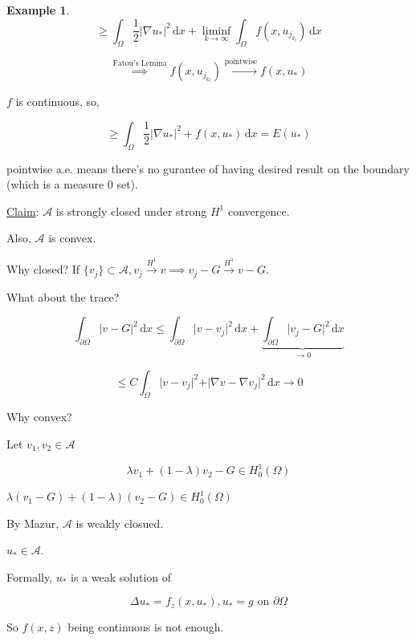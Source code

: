 \documentclass{article}
\theoremstyle{definition}
\newtheorem{example}{Example}
\begin{document}
\begin{example}
    \[
        \geq \int_{\Omega} \frac{1}{2} \vert \nabla u_{\ast} \vert^2  \,\mathrm{d}x + \liminf_{k \to \infty} \int_{\Omega} f(x,u_{j_{k_l} }) \,\mathrm{d}x 
    \]

    \[
        \overset{\text{Fatou's Lemma}}{\implies} f(x,u_{j_{k_l} }) \overset{\text{pointwise}}{\to} f(x,u_{\ast})
    \]

    \(f\) is continuous, so,

    \[
        \geq \int_{\Omega} \frac{1}{2} \vert \nabla u_{\ast} \vert ^2 + f(x,u_{\ast}) \,\mathrm{d}x = E(u_{\ast})
    \]

    pointwise a.e. means there's no gurantee of having desired result on the boundary (which is a measure \(0\) set).

    \underline{Claim}: \(\mathcal{A}\) is strongly closed under strong \(H^1\) convergence.

    Also, \(\mathcal{A}\) is convex.

    Why closed? If \(\{ v_j \} \subset \mathcal{A}, v_j \overset{H^1}{\to} v \implies v_j - G \overset{H^1}{\to} v - G\).

    What about the trace?

    \[
        \int_{\partial \Omega} \vert v - G \vert ^2 \,\mathrm{d}x \leq \int_{\partial \Omega} \vert v - v_j \vert ^2  \,\mathrm{d}x + \underbrace{\int_{\partial\Omega} \vert v_j - G \vert ^2 \,\mathrm{d}x}_{\to 0}
    \]

    \[
        \leq C \int_{\Omega} \vert v - v_j \vert ^ 2 + \vert \nabla v - \nabla v_j \vert ^2 \,\mathrm{d}x \to 0
    \]

    Why convex?

    Let \(v_1, v_2 \in \mathcal{A}\) 
    
    \[
        \lambda v_1 + (1-\lambda)v_2 - G \in H^1_0(\Omega)
    \]

    \(\lambda(v_1 - G) + (1-\lambda)(v_2 - G) \in H^1_0(\Omega)\) 

    By Mazur, \(\mathcal{A}\) is weakly closued.

    \(u_{\ast} \in \mathcal{A}\).

\end{example}

Formally, \(u_{\ast}\) is a weak solution of

\[
    \Delta u_{\ast} = f_z (x, u_{\ast}), u_{\ast} = g \text{ on } \partial \Omega
\]

So \(f(x,z)\) being continuous is not enough.
\end{document}
